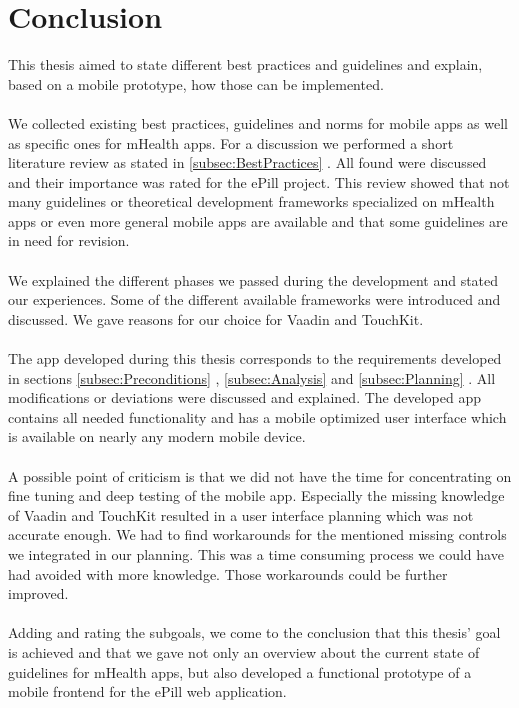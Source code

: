 \section{Conclusion}
This thesis aimed to state different best practices and guidelines and explain, based on a mobile prototype, how those can be implemented.
\\
\\
We collected existing best practices, guidelines and norms for mobile apps as well as specific ones for mHealth apps. For a discussion we performed a short literature review as stated in \ref{subsec:BestPractices} . All found were discussed and their importance was rated for the ePill project. This review showed that not many guidelines or theoretical development frameworks specialized on mHealth apps or even more general mobile apps are available and that some guidelines are in need for revision.
\\
\\
We explained the different phases we passed during the development and stated our experiences. Some of the different available frameworks were introduced and discussed. We gave reasons for our choice for Vaadin and TouchKit.
\\
\\
The app developed during this thesis corresponds to the requirements developed in sections \ref{subsec:Preconditions} , \ref{subsec:Analysis}  and \ref{subsec:Planning} . All modifications or deviations were discussed and explained. The developed app contains all needed functionality and has a mobile optimized user interface which is available on nearly any modern mobile device.
\\
\\
A possible point of criticism is that we did not have the time for concentrating on fine tuning and deep testing of the mobile app. Especially the missing knowledge of Vaadin and TouchKit resulted in a user interface planning which was not accurate enough. We had to find workarounds for the mentioned missing controls we integrated in our planning. This was a time consuming process we could have had avoided with more knowledge. Those workarounds could be further improved.
\\
\\
Adding and rating the subgoals, we come to the conclusion that this thesis' goal is achieved and that we gave not only an overview about the current state of guidelines for mHealth apps, but also developed a functional prototype of a mobile frontend for the ePill web application.